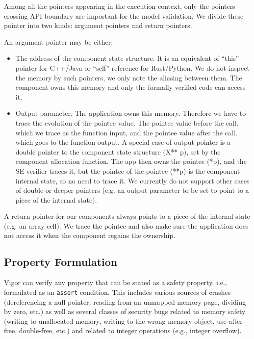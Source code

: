 \documentclass[letterpaper,twocolumn,10pt]{article}
\newcommand{\code}[1]{\lstinline{#1}}
\begin{document}
Among all the pointers appearing in the execution context, only the pointers
crossing API boundary are important for the model validation. We divide these
pointer into two kinds: argument pointers and return pointers.

An argument pointer may be either:
\begin{itemize}
\item The address of the component state structure. It is an equivalent of
  ``this'' pointer for C++/Java or ``self'' reference for Rust/Python. We do not
  inspect the memory by such pointers, we only note the aliasing between them.
  The component owns this memory and only the formally verified code can access
  it.
\item Output parameter. The application owns this memory. Therefore we have to
  trace the evolution of the pointee value. The pointee value before the call,
  which we trace as the function input, and the pointee value after the call,
  which goes to the function output. A special case of output pointer is a
  double pointer to the component state structure (X** p), set by the component
  allocation function. The app then owns the pointee (*p), and the SE verifier
  traces it, but the pointee of the pointee (**p) is the component internal
  state, so no need to trace it. We currently do not support other cases of
  double or deeper pointers (e.g. an output parameter to be set to point to a
  piece of the internal state).
\end{itemize}

A return pointer for our components always points to a piece of the internal
state (e.g. an array cell). We trace the pointee and also make sure the
application does not access it when the component regains the ownership.

\subsection{Property Formulation}
\label{sec:properties}

Vigor can verify any property that can be stated as a safety property, i.e.,
formulated as an \code{assert} condition. This includes various sources of
crashes (dereferencing a null pointer, reading from an unmapped memory page,
dividing by zero, etc.) as well as several classes of security bugs related to
memory safety (writing to unallocated memory, writing to the wrong memory
object, use-after-free, double-free, etc.) and related to integer operations
(e.g., integer overflow).
\end{document}
